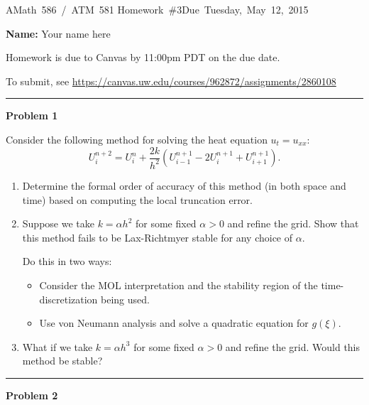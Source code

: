 \documentclass[10pt]{article}
\begin{document}
\hfill\vbox{\hbox{AMath 586 / ATM 581}
\hbox{Homework \#3}\hbox{Due Tuesday, May 12, 2015}}

{\bf Name:} Your name here
\vskip 5pt

Homework is due to Canvas by 11:00pm PDT on the due date.

To submit, see \url{https://canvas.uw.edu/courses/962872/assignments/2860108}


\vskip 1cm
\hrule
{\bf Problem 1}  


Consider the following method for solving the heat equation
$u_t=u_{xx}$:
\[
U_i^{n+2} = U_i^n + \frac{2k}{h^2}(U_{i-1}^{n+1} - 2U_i^{n+1} +
U_{i+1}^{n+1}).
\]
\begin{enumerate}
\item Determine the formal order of accuracy of this method 
(in both space and time) based on computing the local truncation error.

\item Suppose we take $k=\alpha h^2$ for some fixed $\alpha>0$ and refine
the grid.  Show that this method fails to be 
Lax-Richtmyer stable for any choice of $\alpha$.

Do this in two ways: 
\begin{itemize}
\item Consider the MOL interpretation and the stability region of
the time-discretization being used.
\item Use von Neumann analysis and solve a quadratic equation for $g(\xi)$.
\end{itemize} 

\item What if we take $k=\alpha h^3$ for some fixed $\alpha>0$ and refine
the grid. Would this method be stable?

\end{enumerate}




\vskip 1cm
\hrule
{\bf Problem 2}  
\end{document}
